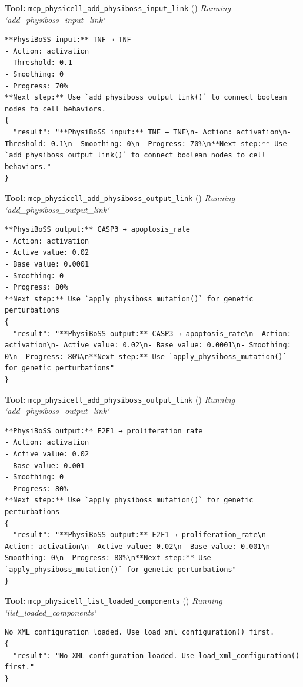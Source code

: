 \documentclass[11pt,a4paper]{article}
\begin{document}
\begin{toolokbox}
\textbf{Tool:} \texttt{mcp\_physicell\_add\_physiboss\_input\_link} (\checkmark)
\textit{Running `add\_physiboss\_input\_link`}
\begin{lstlisting}
**PhysiBoSS input:** TNF → TNF
- Action: activation
- Threshold: 0.1
- Smoothing: 0
- Progress: 70%
**Next step:** Use `add_physiboss_output_link()` to connect boolean nodes to cell behaviors.
{
  "result": "**PhysiBoSS input:** TNF → TNF\n- Action: activation\n- Threshold: 0.1\n- Smoothing: 0\n- Progress: 70%\n**Next step:** Use `add_physiboss_output_link()` to connect boolean nodes to cell behaviors."
}
\end{lstlisting}
\end{toolokbox}
\begin{toolokbox}
\textbf{Tool:} \texttt{mcp\_physicell\_add\_physiboss\_output\_link} (\checkmark)
\textit{Running `add\_physiboss\_output\_link`}
\begin{lstlisting}
**PhysiBoSS output:** CASP3 → apoptosis_rate
- Action: activation
- Active value: 0.02
- Base value: 0.0001
- Smoothing: 0
- Progress: 80%
**Next step:** Use `apply_physiboss_mutation()` for genetic perturbations
{
  "result": "**PhysiBoSS output:** CASP3 → apoptosis_rate\n- Action: activation\n- Active value: 0.02\n- Base value: 0.0001\n- Smoothing: 0\n- Progress: 80%\n**Next step:** Use `apply_physiboss_mutation()` for genetic perturbations"
}
\end{lstlisting}
\end{toolokbox}
\begin{toolokbox}
\textbf{Tool:} \texttt{mcp\_physicell\_add\_physiboss\_output\_link} (\checkmark)
\textit{Running `add\_physiboss\_output\_link`}
\begin{lstlisting}
**PhysiBoSS output:** E2F1 → proliferation_rate
- Action: activation
- Active value: 0.02
- Base value: 0.001
- Smoothing: 0
- Progress: 80%
**Next step:** Use `apply_physiboss_mutation()` for genetic perturbations
{
  "result": "**PhysiBoSS output:** E2F1 → proliferation_rate\n- Action: activation\n- Active value: 0.02\n- Base value: 0.001\n- Smoothing: 0\n- Progress: 80%\n**Next step:** Use `apply_physiboss_mutation()` for genetic perturbations"
}
\end{lstlisting}
\end{toolokbox}
\begin{toolokbox}
\textbf{Tool:} \texttt{mcp\_physicell\_list\_loaded\_components} (\checkmark)
\textit{Running `list\_loaded\_components`}
\begin{lstlisting}
No XML configuration loaded. Use load_xml_configuration() first.
{
  "result": "No XML configuration loaded. Use load_xml_configuration() first."
}
\end{lstlisting}
\end{toolokbox}
\end{document}
